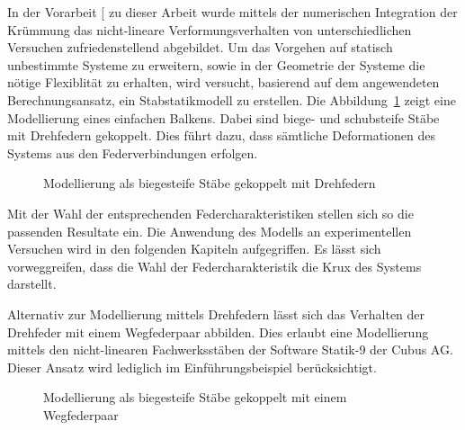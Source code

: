 \documentclass[
  10pt,
  letterpaper,
]{scrreprt}
\begin{document}
In der Vorarbeit {[}\citeproc{ref-gitz_ansatze_2024}{1}{]} zu dieser
Arbeit wurde mittels der numerischen Integration der Krümmung das
nicht-lineare Verformungsverhalten von unterschiedlichen Versuchen
zufriedenstellend abgebildet. Um das Vorgehen auf statisch unbestimmte
Systeme zu erweitern, sowie in der Geometrie der Systeme die nötige
Flexiblität zu erhalten, wird versucht, basierend auf dem angewendeten
Berechnungsansatz, ein Stabstatikmodell zu erstellen. Die
Abbildung~\ref{fig-modell_drehfeder} zeigt eine Modellierung eines
einfachen Balkens. Dabei sind biege- und schubsteife Stäbe mit
Drehfedern gekoppelt. Dies führt dazu, dass sämtliche Deformationen des
Systems aus den Federverbindungen erfolgen.

\begin{figure}[H]


\caption{\label{fig-modell_drehfeder}Modellierung als biegesteife Stäbe
gekoppelt mit Drehfedern}

\end{figure}%

Mit der Wahl der entsprechenden Federcharakteristiken stellen sich so
die passenden Resultate ein. Die Anwendung des Modells an
experimentellen Versuchen wird in den folgenden Kapiteln aufgegriffen.
Es lässt sich vorweggreifen, dass die Wahl der Federcharakteristik die
Krux des Systems darstellt.

Alternativ zur Modellierung mittels Drehfedern lässt sich das Verhalten
der Drehfeder mit einem Wegfederpaar abbilden. Dies erlaubt eine
Modellierung mittels den nicht-linearen Fachwerksstäben der Software
Statik-9 der Cubus AG. Dieser Ansatz wird lediglich im
Einführungsbeispiel berücksichtigt.

\begin{figure}[H]


\caption{\label{fig-modell_wegfeder}Modellierung als biegesteife Stäbe
gekoppelt mit einem Wegfederpaar}

\end{figure}%
\end{document}
